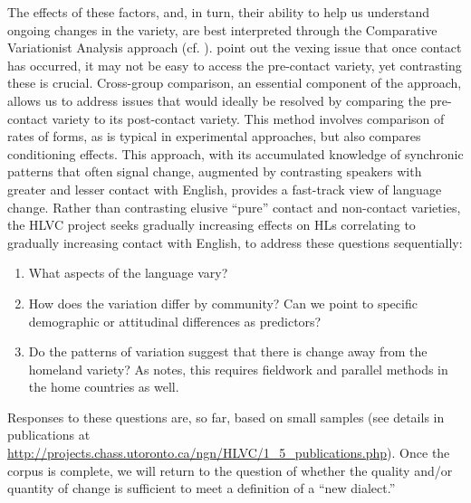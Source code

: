 \documentclass[output=paper]{LSP/langsci}
\begin{document}
The effects of these factors, and, in turn, their ability to help us understand ongoing changes in the variety, are best interpreted through the Comparative Variationist Analysis approach (cf. \citealt{labov_sociolinguistic_1972,tagliamonte_analysing_2006,walker_variation_2010}). \citet[111]{thomason_language_1988} point out the vexing issue that once contact has occurred, it may not be easy to access the pre-contact variety, yet contrasting these is crucial. Cross-group comparison, an essential component of the approach, allows us to address issues that would ideally be resolved by comparing the pre-contact variety to its post-contact variety. This method involves comparison of rates of forms, as is typical in experimental approaches, but also compares conditioning effects. This approach, with its accumulated knowledge of synchronic patterns that often signal change, augmented by contrasting speakers with greater and lesser contact with English, provides a fast-track view of language change. Rather than contrasting elusive “pure” contact and non-contact varieties, the HLVC project seeks gradually increasing effects on HLs correlating to gradually increasing contact with English, to address these questions sequentially: 

\begin{enumerate}
\item What aspects of the language vary?

\item How does the variation differ by community? Can we point to specific demographic or attitudinal differences as predictors?

\item Do the patterns of variation suggest that there is change away from the homeland variety? As \citet{thomason_language_2001} notes, this requires fieldwork and parallel methods in the home countries as well. 
\end{enumerate}

Responses to these questions are, so far, based on small samples (see details in publications at \url{http://projects.chass.utoronto.ca/ngn/HLVC/1\_5\_publications.php}). Once the corpus is complete, we will return to the question of whether the quality and/or quantity of change is sufficient to meet a definition of a “new dialect.”
\end{document}
